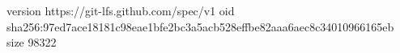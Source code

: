 version https://git-lfs.github.com/spec/v1
oid sha256:97ed7ace18181c98eae1bfe2bc3a5acb528effbe82aaa6aec8c34010966165eb
size 98322

